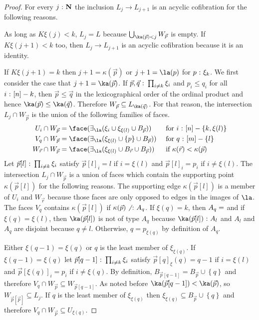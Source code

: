 \documentclass{amsart}
\theoremstyle{plain}
\theoremstyle{definition}
\newcommand\set[1]{\left\{#1\right\}}
\begin{document}
\begin{proof}
For every $j\mathord{\ :\ }\mathbf N$ the inclusion $L_j\to L_{j+1}$ is an acyclic cofibration for the following reasons.

As long as $K\xi(j)<k$, $L_j = L$ because $\bigcup_{ \ka(\vec p) < j } W_{\vec p}$ is empty. If $K\xi(j+1)<k$ too, then $L_j\to L_{j+1}$ is an acyclic cofibration because it is an identity.

If $K\xi(j+1) = k$ then $j+1=\kappa(\vec p)$ or $j+1 = \la(p)$ for $p\mathord{\ :\ }\xi_k$. We first consider the case that $j+1=\ka(\vec p)$. If $\vec p,\vec q\mathord{\ :\ }\prod_{i\neq k} \xi_i$ and $p_i\leq q_i$ for all $i\mathord{\ :\ }[n]-k$, then $\vec p \leq \vec q$ in the lexicographical order of the ordinal product and hence $\ka(\vec p)\leq \ka(\vec q)$. Therefore $W_{\vec p}\subseteq L_{\ka(\vec q)}$. For that reason, the intersection $L_j\cap W_{\vec p}$ is the union of the following families of faces.
\begin{align*}
U_i\cap W_{\vec p} &= \face(\im\la(\xi_i\cup\xi_{\xi(l)}\cup B_{\vec p})) &&\textrm{ for $i\of[n]-\set{k,\xi(l)}$}\\
V_q\cap W_{\vec p} &= \face(\im\la(\xi_{\xi(l)}\cup\set p\cup B_{\vec p})) &&\textrm{ for $q\of[m]-\set l$}\\
W_{\vec r}\cap W_{\vec p} &= \face(\im\la(\xi_{\xi(l)}\cup B_{\vec r}\cup B_{\vec p}))&&\textrm{ if $\kappa(\vec r)<\kappa(\vec p)$ }
\end{align*}
Let $\vec p[l]\mathord{\ :\ }\prod_{i\neq k} \xi_i$ satisfy $\vec p[l]_i = l$ if $i=\xi(l)$ and $\vec p[l]_i = p_i$ if $i\neq \xi(l)$. The intersection $L_j\cap W_{\vec p}$ is a union of faces which contain the supporting point $\kappa(\vec p[l])$ for the following reasons. The supporting edge $\kappa(\vec p[l])$ is a member of $U_i$ and $W_{\vec r}$ because those faces are only opposed to edges in the images of $\la$. The faces $V_q$ contains $\kappa(\vec p[l])$ if $\kappa(\vec p)\not\mathord{\ :\ } A_q$. If $\xi(q) = k$, then $A_q=\empty$ and if $\xi(q) = \xi(l)$, then $\ka(\vec p[l])$ is not of type $A_q$ because $\ka(\vec p[l])\of A_l$ and $A_l$ and $A_q$ are disjoint because $q\neq l$. Otherwise, $q = p_{\xi(q)}$ by definition of $A_q$. 

Either $\xi(q-1) = \xi(q)$ or $q$ is the least member of $\xi_{\xi(q)}$. If $\xi(q-1)=\xi(q)$ let $\vec p[q-1] \mathord{\ :\ } \prod_{i\neq k} \xi_i$ satisfy $\vec p[q]_\xi(q) = q-1$ if $i=\xi(l)$ and $\vec p[\xi(q)]_i = p_i$ if $i\neq \xi(q)$. By definition, $B_{\vec p[q-1]} = B_{\vec p} \cup \set q$ and therefore $V_q\cap W_{\vec p}\subseteq W_{\vec p[q-1]}$. As noted before $\ka(\vec p[q-1])<\ka(\vec p)$, so $W_{\vec p[\vec p]}\subseteq L_{j}$. 
If $q$ is the least member of $\xi_{\xi(q)}$ then $\xi_{\xi(q)}\subseteq B_{\vec p} \cup \set q$ and therefore $V_q\cap W_{\vec p}\subseteq U_{\xi(q)}$. 


\end{proof}
\end{document}
